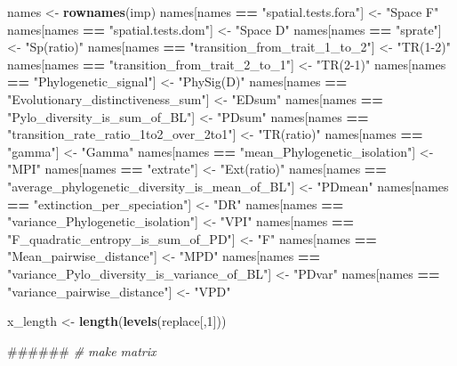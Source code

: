 \documentclass[]{book}
\newenvironment{Shaded}{\begin{snugshade}}{\end{snugshade}}
\newcommand{\KeywordTok}[1]{\textcolor[rgb]{0.13,0.29,0.53}{\textbf{{#1}}}}
\newcommand{\DecValTok}[1]{\textcolor[rgb]{0.00,0.00,0.81}{{#1}}}
\newcommand{\StringTok}[1]{\textcolor[rgb]{0.31,0.60,0.02}{{#1}}}
\newcommand{\CommentTok}[1]{\textcolor[rgb]{0.56,0.35,0.01}{\textit{{#1}}}}
\newcommand{\OperatorTok}[1]{\textcolor[rgb]{0.81,0.36,0.00}{\textbf{{#1}}}}
\newcommand{\NormalTok}[1]{{#1}}
\theoremstyle{definition}
\theoremstyle{definition}
\theoremstyle{definition}
\theoremstyle{remark}
\begin{document}
\begin{Shaded}
\begin{Highlighting}[]
\NormalTok{names <-}\StringTok{ }\KeywordTok{rownames}\NormalTok{(imp)}
\NormalTok{names[names }\OperatorTok{==}\StringTok{ "spatial.tests.fora"}\NormalTok{] <-}\StringTok{ "Space F"}
\NormalTok{names[names }\OperatorTok{==}\StringTok{ "spatial.tests.dom"}\NormalTok{] <-}\StringTok{ "Space D"}
\NormalTok{names[names }\OperatorTok{==}\StringTok{ "sprate"}\NormalTok{] <-}\StringTok{ "Sp(ratio)"}
\NormalTok{names[names }\OperatorTok{==}\StringTok{ "transition_from_trait_1_to_2"}\NormalTok{] <-}\StringTok{ "TR(1-2)"}
\NormalTok{names[names }\OperatorTok{==}\StringTok{ "transition_from_trait_2_to_1"}\NormalTok{] <-}\StringTok{ "TR(2-1)"}
\NormalTok{names[names }\OperatorTok{==}\StringTok{ "Phylogenetic_signal"}\NormalTok{] <-}\StringTok{ "PhySig(D)"}
\NormalTok{names[names }\OperatorTok{==}\StringTok{ "Evolutionary_distinctiveness_sum"}\NormalTok{] <-}\StringTok{ "EDsum"}
\NormalTok{names[names }\OperatorTok{==}\StringTok{ "Pylo_diversity_is_sum_of_BL"}\NormalTok{] <-}\StringTok{ "PDsum"}
\NormalTok{names[names }\OperatorTok{==}\StringTok{ "transition_rate_ratio_1to2_over_2to1"}\NormalTok{] <-}\StringTok{ "TR(ratio)"}
\NormalTok{names[names }\OperatorTok{==}\StringTok{ "gamma"}\NormalTok{] <-}\StringTok{ "Gamma"}
\NormalTok{names[names }\OperatorTok{==}\StringTok{ "mean_Phylogenetic_isolation"}\NormalTok{] <-}\StringTok{ "MPI"}
\NormalTok{names[names }\OperatorTok{==}\StringTok{ "extrate"}\NormalTok{] <-}\StringTok{ "Ext(ratio)"}
\NormalTok{names[names }\OperatorTok{==}\StringTok{ "average_phylogenetic_diversity_is_mean_of_BL"}\NormalTok{] <-}\StringTok{ "PDmean"}
\NormalTok{names[names }\OperatorTok{==}\StringTok{ "extinction_per_speciation"}\NormalTok{] <-}\StringTok{ "DR"}
\NormalTok{names[names }\OperatorTok{==}\StringTok{ "variance_Phylogenetic_isolation"}\NormalTok{] <-}\StringTok{ "VPI"}
\NormalTok{names[names }\OperatorTok{==}\StringTok{ "F_quadratic_entropy_is_sum_of_PD"}\NormalTok{] <-}\StringTok{ "F"}
\NormalTok{names[names }\OperatorTok{==}\StringTok{ "Mean_pairwise_distance"}\NormalTok{] <-}\StringTok{ "MPD"}
\NormalTok{names[names }\OperatorTok{==}\StringTok{ "variance_Pylo_diversity_is_variance_of_BL"}\NormalTok{] <-}\StringTok{ "PDvar"}
\NormalTok{names[names }\OperatorTok{==}\StringTok{ "variance_pairwise_distance"}\NormalTok{] <-}\StringTok{ "VPD"}


\NormalTok{x_length <-}\StringTok{ }\KeywordTok{length}\NormalTok{(}\KeywordTok{levels}\NormalTok{(replace[,}\DecValTok{1}\NormalTok{]))}

\NormalTok{######}
\CommentTok{# make matrix}









\end{Highlighting}
\end{Shaded}
\end{document}
